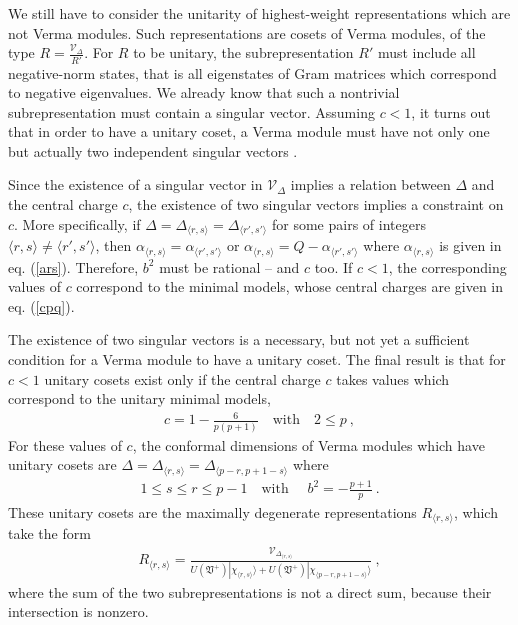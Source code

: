 \documentclass[12pt,a4paper,notitlepage]{report}
\numberwithin{equation}{section}
\theoremstyle{break}
\begin{document}
We still have to consider the unitarity of highest-weight representations which are not Verma modules. Such representations are cosets of Verma modules, of the type $R=\frac{\mathcal{V}_\Delta}{R'}$. For $R$ to be unitary, the subrepresentation $R'$ must include all negative-norm states, that is all eigenstates of Gram matrices which correspond to negative eigenvalues. We already know that such a nontrivial subrepresentation must contain a singular vector.
Assuming $c<1$, it turns out that in order to have a unitary coset, a Verma module must have not only one but actually two independent singular vectors \cite{fms97}. 

Since the existence of a singular vector in $\mathcal{V}_\Delta$ implies a relation between $\Delta$ and the central charge $c$, the existence of two singular vectors implies a constraint on $c$. More specifically, if 
$\Delta=\Delta_{\langle r,s \rangle}=\Delta_{\langle r',s' \rangle}$ for some pairs of integers $\langle r,s \rangle\neq \langle r',s' \rangle$, then $\alpha_{\langle r,s \rangle}=\alpha_{\langle r',s' \rangle}$ or $\alpha_{\langle r,s \rangle}=Q-\alpha_{\langle r',s' \rangle}$ where $\alpha_{\langle r,s \rangle}$ is given in eq. (\ref{ars}). Therefore, $b^2$ must be rational -- and $c$ too. If $c<1$, the corresponding values of $c$ correspond to the minimal models, whose central charges are given in eq. (\ref{cpq}). 

The existence of two singular vectors is a necessary, but not yet a sufficient condition for a Verma module to have a unitary coset. The final result is that for $c<1$ unitary cosets exist only if the central charge $c$ takes values which correspond to the unitary minimal models,
\begin{align}
 c = 1-\frac{6}{p(p+1)}  \quad \text{with} \quad 2\leq p\ ,
\label{cpp}
\end{align}
For these values of $c$,
the conformal dimensions of Verma modules which have unitary cosets are $\Delta=\Delta_{\langle r,s \rangle}=\Delta_{\langle p-r,p+1-s \rangle}$ where
\begin{align}
   1\leq s\leq r\leq p-1 \quad \text{with } \quad b^2=-\frac{p+1}{p}\ .
\end{align}
These unitary cosets are the maximally degenerate representations $R_{\langle r,s \rangle}$, which take the form
\begin{align}
 R_{\langle r,s \rangle} = \frac{\mathcal{V}_{\Delta_{\langle r,s \rangle}}}{U(\mathfrak{V}^+)|\chi_{\langle r,s \rangle}\rangle + U(\mathfrak{V}^+)|\chi_{\langle p-r,p+1-s \rangle}\rangle}\ ,
\label{rrs}
\end{align}
where the sum of the two subrepresentations is not a direct sum, because their intersection is nonzero. 
\end{document}
